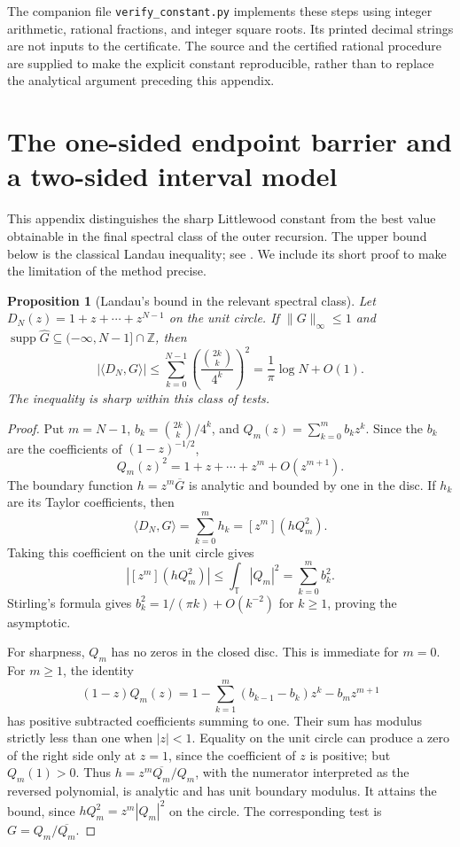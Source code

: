 \documentclass[11pt,reqno]{amsart}
\numberwithin{equation}{section}
\newtheorem{proposition}[theorem]{Proposition}
\theoremstyle{definition}
\theoremstyle{remark}
\newcommand{\Z}{\mathbb Z}
\newcommand{\T}{\mathbb T}
\newcommand{\norm}[1]{\lVert#1\rVert}
\newcommand{\ip}[2]{\langle#1,#2\rangle}
\DeclareMathOperator{\supp}{supp}
\begin{document}
The companion file \texttt{verify\_constant.py} implements these steps
using integer arithmetic, rational fractions, and integer square roots.
Its printed decimal strings are not inputs to the certificate. The
source and the certified rational procedure are supplied to make the
explicit constant reproducible, rather than to replace the analytical
argument preceding this appendix.

\clearpage
\section{The one-sided endpoint barrier and a two-sided interval model}
\label{app:landau}

This appendix distinguishes the sharp Littlewood constant from the
best value obtainable in the final spectral class of the outer
recursion. The upper bound below is the classical Landau inequality;
see \cite{LandauAsymptotics,Kovalev}. We include its short proof to make
the limitation of the method precise.

\begin{proposition}[Landau's bound in the relevant spectral class]
\label{prop:landau}
Let $D_N(z)=1+z+\cdots+z^{N-1}$ on the unit circle. If
$\norm G_\infty\le1$ and $\supp\widehat G\subseteq(-\infty,N-1]\cap\Z$,
then
\begin{equation}\label{eq:landau}
 |\ip{D_N}G|\le
 \sum_{k=0}^{N-1}\left(\frac{\binom{2k}{k}}{4^k}\right)^2
 =\frac1\pi\log N+O(1).
\end{equation}
The inequality is sharp within this class of tests.
\end{proposition}
\begin{proof}
Put $m=N-1$, $b_k=\binom{2k}{k}/4^k$, and
$Q_m(z)=\sum_{k=0}^m b_kz^k$. Since the $b_k$ are the coefficients of
$(1-z)^{-1/2}$,
\[
 Q_m(z)^2=1+z+\cdots+z^m+O(z^{m+1}).
\]
The boundary function $h=z^m\overline G$ is analytic and bounded by
one in the disc. If $h_k$ are its Taylor coefficients, then
\[
 \ip{D_N}G=\sum_{k=0}^m h_k=[z^m](hQ_m^2).
\]
Taking this coefficient on the unit circle gives
\[
 |[z^m](hQ_m^2)|\le\int_\T|Q_m|^2=\sum_{k=0}^m b_k^2.
\]
Stirling's formula gives $b_k^2=1/(\pi k)+O(k^{-2})$ for $k\ge1$,
proving the asymptotic.

For sharpness, $Q_m$ has no zeros in the closed disc. This is immediate
for $m=0$. For $m\ge1$, the identity
\[
 (1-z)Q_m(z)=1-\sum_{k=1}^m(b_{k-1}-b_k)z^k-b_mz^{m+1}
\]
has positive subtracted coefficients summing to one. Their sum has
modulus strictly less than one when $|z|<1$. Equality on the unit
circle can produce a zero of the right side only at $z=1$, since the
coefficient of $z$ is positive; but $Q_m(1)>0$. Thus
$h=z^m\overline{Q_m}/Q_m$, with the numerator interpreted as the
reversed polynomial, is analytic and has unit boundary modulus. It
attains the bound, since
$hQ_m^2=z^m|Q_m|^2$ on the circle. The corresponding test is
$G=Q_m/\overline{Q_m}$.
\end{proof}
\end{document}
